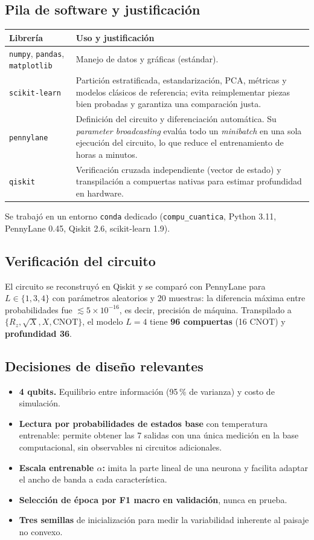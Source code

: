 \documentclass[11pt,letterpaper]{article}
\begin{document}
\subsection{Pila de software y justificación}
\begin{table}[H]
\centering
\small
\begin{tabular}{@{}p{3.1cm}p{11.4cm}@{}}
\toprule
Librería & Uso y justificación \\ \midrule
\texttt{numpy}, \texttt{pandas}, \texttt{matplotlib} & Manejo de datos y gráficas (estándar). \\
\texttt{scikit-learn} & Partición estratificada, estandarización, PCA, métricas y modelos
clásicos de referencia; evita reimplementar piezas bien probadas y garantiza una comparación justa. \\
\texttt{pennylane} & Definición del circuito y diferenciación automática. Su \emph{parameter
broadcasting} evalúa todo un \emph{minibatch} en una sola ejecución del circuito, lo que reduce el
entrenamiento de horas a minutos. \\
\texttt{qiskit} & Verificación cruzada independiente (vector de estado) y transpilación a
compuertas nativas para estimar profundidad en hardware. \\
\bottomrule
\end{tabular}
\end{table}
Se trabajó en un entorno \texttt{conda} dedicado (\texttt{compu\_cuantica}, Python 3.11,
PennyLane 0.45, Qiskit 2.6, scikit-learn 1.9).

\subsection{Verificación del circuito}
El circuito se reconstruyó en Qiskit y se comparó con PennyLane para $L\in\{1,3,4\}$ con
parámetros aleatorios y 20 muestras: la diferencia máxima entre probabilidades fue
$\lesssim5\times10^{-16}$, es decir, precisión de máquina. Transpilado a $\{R_z,\sqrt{X},X,\mathrm{CNOT}\}$,
el modelo $L=4$ tiene \textbf{96 compuertas} (16 CNOT) y \textbf{profundidad 36}.

\subsection{Decisiones de diseño relevantes}
\begin{itemize}[leftmargin=*]
\item \textbf{4 qubits.} Equilibrio entre información (95\,\% de varianza) y costo de simulación.
\item \textbf{Lectura por probabilidades de estados base} con temperatura entrenable: permite
obtener las 7 salidas con una única medición en la base computacional, sin observables ni circuitos adicionales.
\item \textbf{Escala entrenable $\alpha$:} imita la parte lineal de una neurona y facilita adaptar el
ancho de banda a cada característica.
\item \textbf{Selección de época por F1 macro en validación}, nunca en prueba.
\item \textbf{Tres semillas} de inicialización para medir la variabilidad inherente al paisaje no
convexo.
\end{itemize}
\end{document}

